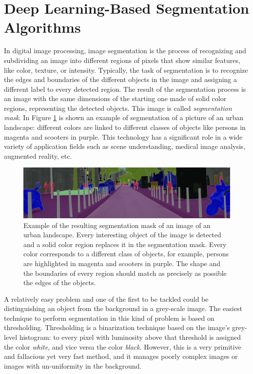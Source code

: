 \section{Deep Learning-Based Segmentation Algorithms}
In digital image processing, image segmentation is the process of recognizing and subdividing an image into different regions of pixels that show similar features, like color, texture, or intensity. Typically, the task of segmentation is to recognize the edges and boundaries of the different objects in the image and assigning a different label to every detected region. The result of the segmentation process is an image with the same dimensions of the starting one made of solid color regions, representing the detected objects. This image is called \textit{segmentation mask}. In Figure \ref{fig:seg_example} is shown an example of segmentation of a picture of an urban landscape: different colors are linked to different classes of objects like persons in magenta and scooters in purple. This technology has a significant role in a wide variety of application fields such as scene understanding, medical image analysis, augmented reality, etc.

\begin{figure}
    \centering
    \includegraphics[width = \textwidth]{images/seg_example}
    \caption{Example of the resulting segmentation mask of an image of an urban landscape. Every interesting object of the image is detected and a solid color region replaces it in the segmentation mask. Every color corresponds to a different class of objects, for example, persons are highlighted in magenta and scooters in purple. The shape and the boundaries of every region should match as precisely as possible the edges of the objects.}
    \label{fig:seg_example}
\end{figure}

A relatively easy problem and one of the first to be tackled could be distinguishing an object from the background in a grey-scale image. The easiest technique to perform segmentation in this kind of problem is based on thresholding. Thresholding is a binarization technique based on the image's grey-level histogram: to every pixel with luminosity above that threshold is assigned the color \textit{white}, and vice versa the color \textit{black}. However, this is a very primitive and fallacious yet very fast method, and it manages poorly complex images or images with un-uniformity in the background.

